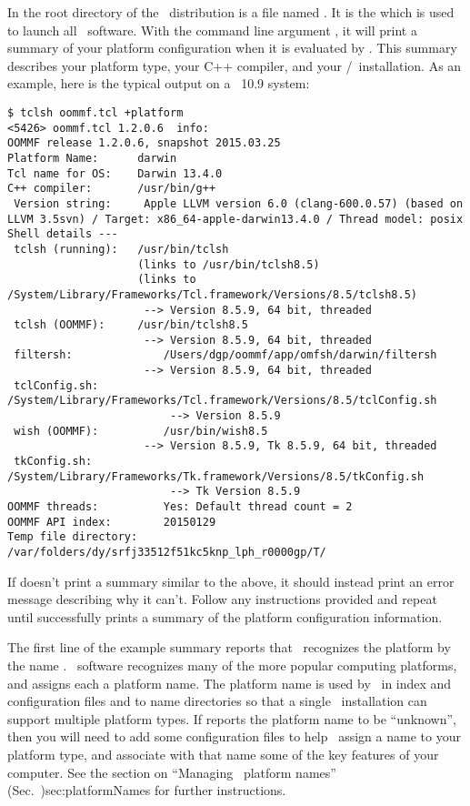 In the root directory of the \OOMMF\ distribution is a file
named .  It is the 
which is used to launch all \OOMMF\ software.  With the command line
argument , 
it will print a summary of your
platform configuration when it is evaluated by .
This summary describes your platform type, your C++ compiler,
and your \Tcl/\Tk\ installation.  As an example, 
here is the typical output on a \MacOSX\ 10.9 system:
\begin{verbatim}
$ tclsh oommf.tcl +platform
<5426> oommf.tcl 1.2.0.6  info:
OOMMF release 1.2.0.6, snapshot 2015.03.25
Platform Name:		darwin
Tcl name for OS:	Darwin 13.4.0
C++ compiler:   	/usr/bin/g++ 
 Version string:	 Apple LLVM version 6.0 (clang-600.0.57) (based on LLVM 3.5svn) / Target: x86_64-apple-darwin13.4.0 / Thread model: posix
Shell details ---
 tclsh (running): 	/usr/bin/tclsh
                  	(links to /usr/bin/tclsh8.5)
                  	(links to /System/Library/Frameworks/Tcl.framework/Versions/8.5/tclsh8.5)
                  	 --> Version 8.5.9, 64 bit, threaded
 tclsh (OOMMF): 	/usr/bin/tclsh8.5
                  	 --> Version 8.5.9, 64 bit, threaded
 filtersh:           	/Users/dgp/oommf/app/omfsh/darwin/filtersh
                  	 --> Version 8.5.9, 64 bit, threaded
 tclConfig.sh:        	/System/Library/Frameworks/Tcl.framework/Versions/8.5/tclConfig.sh
                      	 --> Version 8.5.9
 wish (OOMMF):        	/usr/bin/wish8.5
                  	 --> Version 8.5.9, Tk 8.5.9, 64 bit, threaded
 tkConfig.sh:         	/System/Library/Frameworks/Tk.framework/Versions/8.5/tkConfig.sh
                      	 --> Tk Version 8.5.9
OOMMF threads:         	Yes: Default thread count = 2
OOMMF API index:       	20150129
Temp file directory: 	/var/folders/dy/srfj33512f51kc5knp_lph_r0000gp/T/
\end{verbatim}

If  doesn't print a summary similar to the
above, it should instead print an error message describing why it can't.
Follow any instructions provided
and repeat until  successfully prints a summary
of the platform configuration information.

The first line of the example summary reports that \OOMMF\ recognizes
the platform by the name .  \OOMMF\ software recognizes many
of the more popular computing platforms, and assigns each a platform
name.  The platform name is used by \OOMMF\ in index and configuration
files and to name directories so that a single \OOMMF\ installation can
support multiple platform types.  If  reports
the platform name to be ``unknown'', then you will need to add some
configuration files to help \OOMMF\ assign a name to your platform type,
and associate with that name some of the key features of your computer.
See the section on
{``Managing \OOMMF\ platform names'' (Sec.~}{)}{sec:platformNames}
for further instructions.

